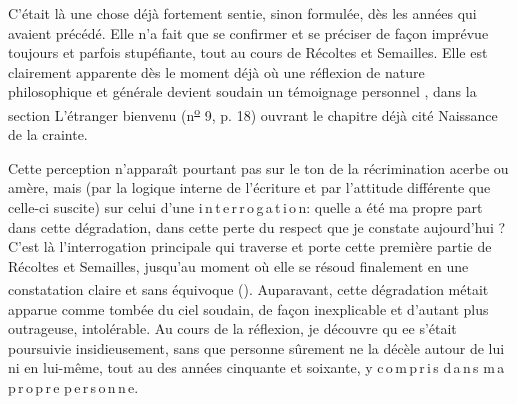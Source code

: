 C'était là une chose déjà fortement sentie, sinon formulée, dès les années qui avaient précédé. Elle n'a fait que se confirmer et se préciser\handwritten{,} de façon  imprévue toujours et parfois stupéfiante, tout au cours de Récoltes et Semailles. Elle est clairement apparente dès le moment\unsure{,} déjà où une réflexion de nature philosophique et générale devient soudain un témoignage personnel , dans la section L'étranger bienvenu (n\textsuperscript{\uline{o}} 9, p. 18) ouvrant le chapitre déjà cité Naissance de la crainte\deleted{\unsure{)}}.

Cette perception n'apparaît pourtant pas sur le ton de la récrimination acerbe ou amère, mais (par la logique interne de l'écriture et par l'attitude différente que celle-ci suscite) sur celui d'une \mbox{i\,n\,t\,e\,r\,r\,o\,g\,a\,t\,i\,o\,n}: quelle a été ma propre part dans cette dégradation, dans cette perte du respect que je constate aujourd'hui ? C'est là l'interrogation principale qui traverse et porte cette première partie de Récoltes et Semailles, jusqu'au moment où elle se résoud finalement en une constatation claire et sans équivoque (\textsuperscript{}). Auparavant, cette dégradation métait apparue comme tombée du ciel soudain, de façon inexplicable et d'autant plus outrageuse, intolérable. Au cours de la réflexion, je découvre qu ee  s'était  poursuivie insidieusement, sans que personne sûrement ne la décèle autour de lui ni en lui-même, tout au  des années cinquante et soixante, \mbox{y} \mbox{c\,o\,m\,p\,r\,i\,s} \mbox{d\,a\,n\,s} \mbox{m\,a} \mbox{p\,r\,o\,p\,r\,e} \mbox{p\,e\,r\,s\,o\,n\,n\,e}.

